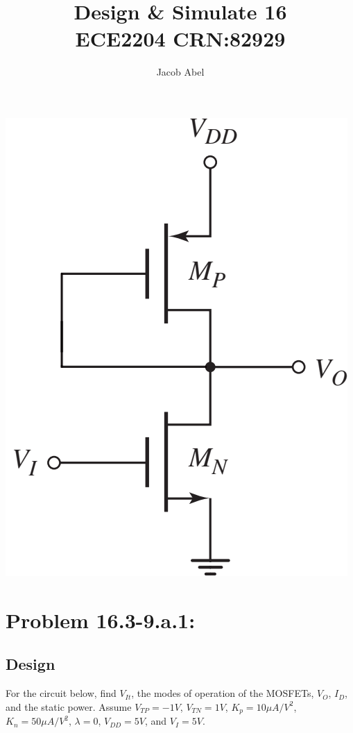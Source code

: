 \documentclass[12pt,letterpaper,titlepage]{article}
\author{Jacob Abel}
\title{	Design \& Simulate 16
	\\\large ECE2204 CRN:82929
}
\begin{document}
\maketitle
\begin{raggedright}
\begin{paracol}{2}
\switchcolumn
\begin{center}
\includegraphics[width=\textwidth, height=17\baselineskip, keepaspectratio=true]{ds1}
\end{center}
\switchcolumn
\section{Problem 16.3-9.a.1: } 
\subsection{Design}

For the circuit below, find $V_{It}$, the modes of operation of the MOSFETs, $V_O$, $I_D$, and the static power. Assume $V_{TP} = -1V$, $V_{TN} = 1V$, $K_p = 10\mu A/V^2$, $K_n = 50\mu A/V^2$, $\lambda = 0$, $V_{DD} = 5V$, and $V_I = 5V$.


\end{paracol}
\end{raggedright}
\end{document}
